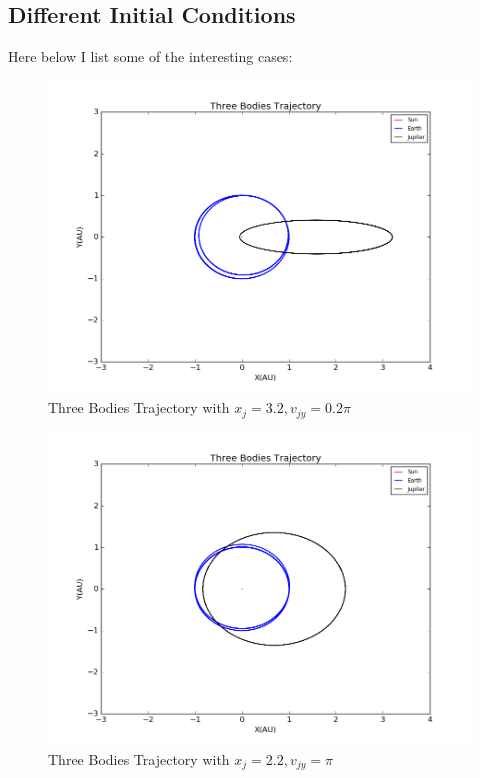 \documentclass[10pt,a4paper]{article}
\begin{document}
    \subsection{Different Initial Conditions}
    Here below I list some of the interesting cases:
    \begin{figure}[htbp]
    	\centering
    	\includegraphics[width=5in]{threebodies_2.png}
    	\caption{Three Bodies Trajectory with $x_j=3.2, v_{jy}=0.2\pi$}
    \end{figure}
   \begin{figure}[htbp]
   	\centering
   	\includegraphics[width=5in]{threebodies_3.png}
   	\caption{Three Bodies Trajectory with $x_j=2.2, v_{jy}=\pi$}
   \end{figure}
\end{document}
